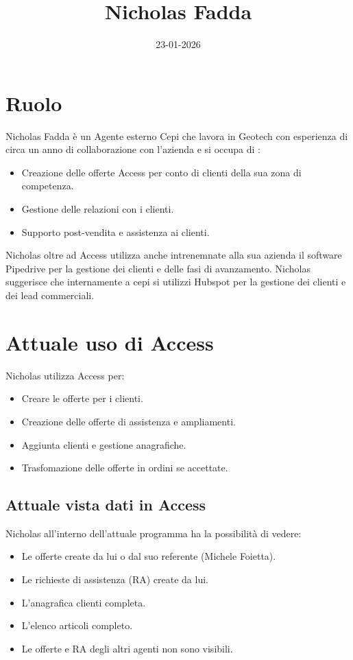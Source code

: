 \documentclass[12pt, a4paper]{article} %
\title{Nicholas Fadda}
\date{23-01-2026}
\begin{document}
\maketitle

\section{Ruolo}
Nicholas Fadda è un Agente esterno Cepi che lavora in Geotech con esperienza di
circa un anno di collaborazione con l'azienda e si occupa di :
\begin{itemize}
      \item Creazione delle offerte Access per conto di clienti della sua zona di
            competenza.
      \item Gestione delle relazioni con i clienti.
      \item Supporto post-vendita e assistenza ai clienti.
\end{itemize}
Nicholas oltre ad Access utilizza anche intrenemnate alla sua azienda il software Pipedrive per la gestione dei clienti e delle fasi di avanzamento.
Nicholas suggerisce che internamente a cepi si utilizzi Hubspot per la gestione dei clienti e dei lead commerciali.

\section{Attuale uso di Access}
Nicholas utilizza Access per:
\begin{itemize}
      \item Creare le offerte per i clienti.
      \item Creazione delle offerte di assistenza e ampliamenti.
      \item Aggiunta clienti e gestione anagrafiche.
      \item Trasfomazione delle offerte in ordini se accettate.
\end{itemize}

\subsection{Attuale vista dati in Access}
Nicholas all'interno dell'attuale programma ha la possibilità di vedere:
\begin{itemize}
      \item Le offerte create da lui o dal suo referente (Michele Foietta).
      \item Le richieste di assistenza (RA) create da lui.
      \item L'anagrafica clienti completa.
      \item L'elenco articoli completo.
      \item Le offerte e RA degli altri agenti non sono visibili.
\end{itemize}
\end{document}
